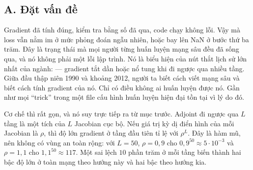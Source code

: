 \documentclass[../../../deep_learning.tex]{subfiles}
\begin{document}
\subsection{A. Đặt vấn đề}
Gradient đã tính đúng, kiểm tra bằng số đã qua, code chạy không lỗi. Vậy mà loss vẫn nằm im ở mức phỏng đoán ngẫu nhiên, hoặc bay lên NaN ở bước thứ ba trăm. Đây là trạng thái mà mọi người từng huấn luyện mạng sâu đều đã sống qua, và nó không phải một lỗi lập trình. Nó là biểu hiện của nút thắt lịch sử lớn nhất của ngành:  --- gradient tắt dần hoặc nổ tung khi đi ngược qua nhiều tầng. Giữa đầu thập niên 1990 và khoảng 2012, người ta biết cách viết mạng sâu và biết cách tính gradient của nó. Chỉ có điều không ai huấn luyện được nó. Gần như mọi ``trick'' trong một file cấu hình huấn luyện hiện đại tồn tại vì lý do đó.

Cơ chế thì rất gọn, và nó suy trực tiếp ra từ mục trước. Adjoint đi ngược qua \(L\) tầng là một tích của \(L\) Jacobian cục bộ. Nếu giá trị kỳ dị điển hình của mỗi Jacobian là \(\rho\), thì độ lớn gradient ở tầng đầu tiên tỉ lệ với \(\rho^{L}\). Đây là hàm mũ, nên không có vùng an toàn rộng: với \(L = 50\), \(\rho = 0{,}9\) cho \(0{,}9^{50} \approx 5\cdot 10^{-3}\) và \(\rho = 1{,}1\) cho \(1{,}1^{50} \approx 117\). Một sai lệch \(10\) phần trăm ở mỗi tầng biến thành hai bậc độ lớn ở toàn mạng theo hướng này và hai bậc theo hướng kia.
\end{document}
